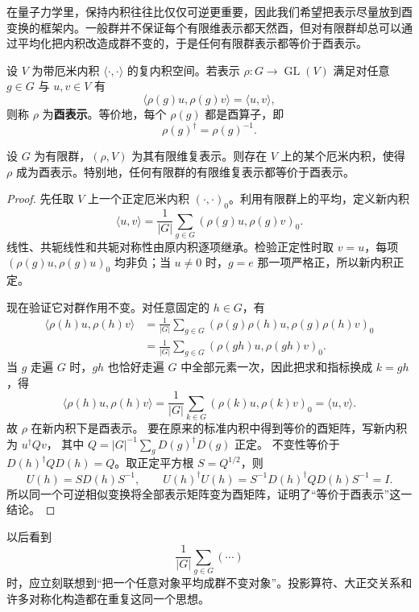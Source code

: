 在量子力学里，保持内积往往比仅仅可逆更重要，因此我们希望把表示尽量放到酉变换的框架内。一般群并不保证每个有限维表示都天然酉，但对有限群却总可以通过平均化把内积改造成群不变的，于是任何有限群表示都等价于酉表示。

\begin{definition}[酉表示]
设 $V$ 为带厄米内积 $\langle\cdot,\cdot\rangle$ 的复内积空间。若表示 $\rho:G\to\operatorname{GL}(V)$ 满足对任意 $g\in G$ 与 $u,v\in V$ 有
\[
\langle \rho(g)u,\rho(g)v\rangle=\langle u,v\rangle,
\]
则称 $\rho$ 为\textbf{酉表示}。等价地，每个 $\rho(g)$ 都是酉算子，即
\[
\rho(g)^{\dagger}=\rho(g)^{-1}.
\]
\label{def:unitary-representation}
\end{definition}

\begin{theorem}[有限群表示的酉化]
设 $G$ 为有限群，$(\rho,V)$ 为其有限维复表示。则存在 $V$ 上的某个厄米内积，使得 $\rho$ 成为酉表示。特别地，任何有限群的有限维复表示都等价于酉表示。
\label{thm:unitarization}

\end{theorem}

\begin{proof}
先任取 $V$ 上一个正定厄米内积 $(\cdot,\cdot)_0$。利用有限群上的平均，定义新内积
\[
\langle u,v\rangle
=\frac1{|G|}\sum_{g\in G}(\rho(g)u,\rho(g)v)_0.
\]
线性、共轭线性和共轭对称性由原内积逐项继承。检验正定性时取 $v=u$，每项 $(\rho(g)u,\rho(g)u)_0$ 均非负；当 $u\ne0$ 时，$g=e$ 那一项严格正，所以新内积正定。

现在验证它对群作用不变。对任意固定的 $h\in G$，有
\begin{align*}
\langle \rho(h)u,\rho(h)v\rangle
&=\frac1{|G|}\sum_{g\in G}(\rho(g)\rho(h)u,\rho(g)\rho(h)v)_0\\
&=\frac1{|G|}\sum_{g\in G}(\rho(gh)u,\rho(gh)v)_0.
\end{align*}
当 $g$ 走遍 $G$ 时，$gh$ 也恰好走遍 $G$ 中全部元素一次，因此把求和指标换成 $k=gh$，得
\[
\langle \rho(h)u,\rho(h)v\rangle
=\frac1{|G|}\sum_{k\in G}(\rho(k)u,\rho(k)v)_0
=\langle u,v\rangle.
\]
故 $\rho$ 在新内积下是酉表示。
要在原来的标准内积中得到等价的酉矩阵，写新内积为 $u^\dagger Qv$，
其中 $Q=|G|^{-1}\sum_gD(g)^\dagger D(g)$ 正定。
不变性等价于 $D(h)^\dagger QD(h)=Q$。取正定平方根 $S=Q^{1/2}$，则
\[
U(h)=SD(h)S^{-1},\qquad
U(h)^\dagger U(h)
=S^{-1}D(h)^\dagger QD(h)S^{-1}=I.
\]
所以同一个可逆相似变换将全部表示矩阵变为酉矩阵，证明了“等价于酉表示”这一结论。
\end{proof}

以后看到
\[
\frac1{|G|}\sum_{g\in G}(\cdots)
\]
时，应立刻联想到“把一个任意对象平均成群不变对象”。投影算符、大正交关系和许多对称化构造都在重复这同一个思想。


